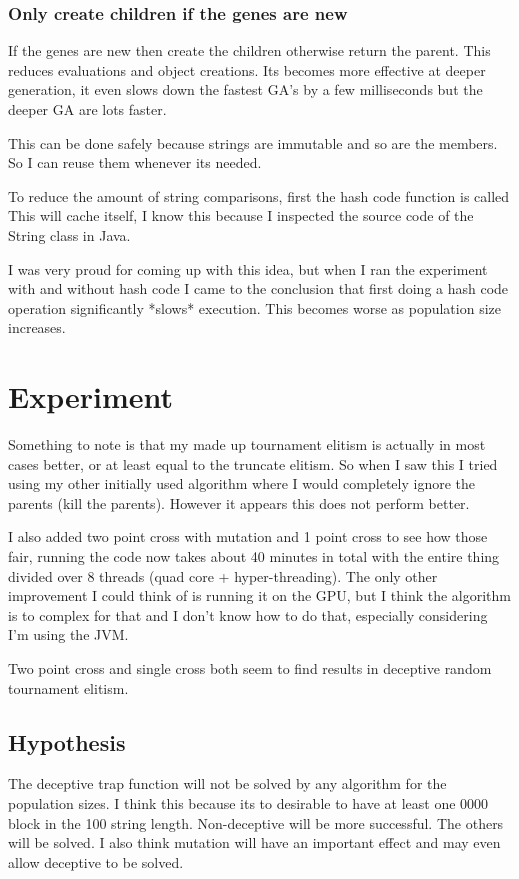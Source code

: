 \documentclass{article}
\begin{document}
\begin{empfile}
\subsubsection{Only create children if the genes are new}
If the genes are new then create the children otherwise return the parent.
This reduces evaluations and object creations. Its becomes more effective
at deeper generation, it even slows down the fastest GA's by a few milliseconds
but the deeper GA are lots faster.

This can be done safely because strings are immutable and so are the members.
So I can reuse them whenever its needed.

To reduce the amount of string comparisons, first the hash code function is called
This will cache itself, I know this because I inspected the source code of the
String class in Java.

I was very proud for coming up with  this idea, but when I ran the experiment with
and without hash code I came to the conclusion that first doing a hash code operation
significantly *slows* execution. This becomes worse as population size increases.

\section{Experiment}
Something to note is that my made up tournament elitism is actually in most
cases better, or at least equal to the truncate elitism. So when I saw
this I tried using my other initially used algorithm where I would completely
ignore the parents (kill the parents). However it appears this does not
perform better.

I also added two point cross with mutation and 1 point cross to see how
those fair, running the code now takes about 40 minutes in total with the
entire thing divided over 8 threads (quad core + hyper-threading). The only
other improvement I could think of is running it on the GPU, but I think
the algorithm is to complex for that and I don't know how to do that,
especially considering I'm using the JVM.

Two point cross and single cross both seem to find results in deceptive
random tournament elitism.
\subsection{Hypothesis}
The deceptive trap function will not be solved by any algorithm for
the population sizes. I think this because its to desirable to have
at least one 0000 block in the 100 string length.
Non-deceptive will be more successful. The others will be solved.
I also think mutation will have an important effect and may even
allow deceptive to be solved.


\end{empfile}
\end{document}
